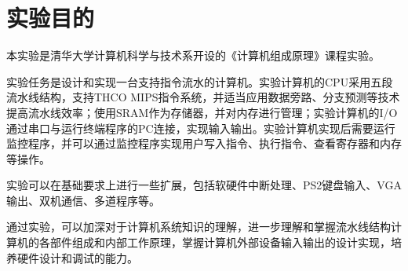 
\chapter{实验目的} %

\label{Chapter1} %


\newcommand{\keyword}[1]{\textbf{#1}}
\newcommand{\tabhead}[1]{\textbf{#1}}
\newcommand{\code}[1]{\texttt{#1}}
\newcommand{\file}[1]{\texttt{\bfseries#1}}
\newcommand{\option}[1]{\texttt{\itshape#1}}

本实验是清华大学计算机科学与技术系开设的《计算机组成原理》课程实验。

实验任务是设计和实现一台支持指令流水的计算机。实验计算机的CPU采用五段流水线结构，支持THCO MIPS指令系统，并适当应用数据旁路、分支预测等技术提高流水线效率；使用SRAM作为存储器，并对内存进行管理；实验计算机的I/O通过串口与运行终端程序的PC连接，实现输入输出。实验计算机实现后需要运行监控程序，并可以通过监控程序实现用户写入指令、执行指令、查看寄存器和内存等操作。

实验可以在基础要求上进行一些扩展，包括软硬件中断处理、PS2键盘输入、VGA输出、双机通信、多道程序等。

通过实验，可以加深对于计算机系统知识的理解，进一步理解和掌握流水线结构计算机的各部件组成和内部工作原理，掌握计算机外部设备输入输出的设计实现，培养硬件设计和调试的能力。


